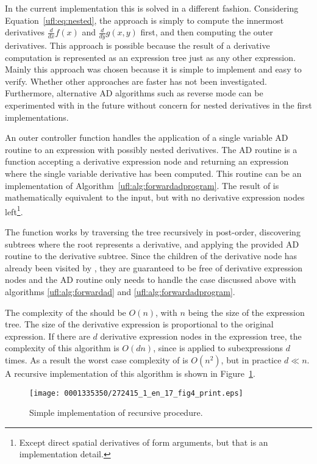 In the current \ufl{} implementation this is solved in a different
fashion.  Considering Equation~\eqref{ufl:eq:nested}, the approach is
simply to compute the innermost derivatives $\frac{d}{dx} f(x)$ and
$\frac{d}{dy} g(x,y)$ first, and then computing the outer derivatives.
This approach is possible because the result of a derivative computation
is represented as an expression tree just as any other expression.
Mainly this approach was chosen because it is simple to implement
and easy to verify.  Whether other approaches are faster has not been
investigated.  Furthermore, alternative AD algorithms such as reverse
mode can be experimented with in the future without concern for nested
derivatives in the first implementations.

An outer controller function  handles the application
of a single variable AD routine to an expression with possibly nested
derivatives.  The AD routine is a function accepting a derivative
expression node and returning an expression where the single variable
derivative has been computed.  This routine can be an implementation of
Algorithm~\ref{ufl:alg:forwardadprogram}.  The result of 
is mathematically equivalent to the input, but with no derivative
expression nodes left\footnote{Except direct spatial
  derivatives of form arguments, but that is an implementation detail.}.

The function  works by traversing the tree recursively
in post-order, discovering subtrees where the root represents a
derivative, and applying the provided AD routine to the derivative
subtree.  Since the children of the derivative node has already
been visited by , they are guaranteed to be free of
derivative expression nodes and the AD routine only needs to handle
the case discussed above with algorithms \ref{ufl:alg:forwardad} and
\ref{ufl:alg:forwardadprogram}.

The complexity of the  should be $O(n)$, with $n$
being the size of the expression tree.  The size of the derivative
expression is proportional to the original expression.  If there are
$d$ derivative expression nodes in the expression tree, the complexity
of this algorithm is $O(d n)$, since  is applied to
subexpressions $d$ times.  As a result the worst case complexity of
 is $O(n^2)$, but in practice $d \ll n$.  A recursive
implementation of this algorithm is shown in Figure~\ref{ufl:fig:applyad}.

\begin{figure}
\bwfig
\texttt{[image: 0001335350/272415\_1\_en\_17\_fig4\_print.eps]}
\caption{Simple implementation of recursive  procedure.}
\label{ufl:fig:applyad}
\end{figure}

